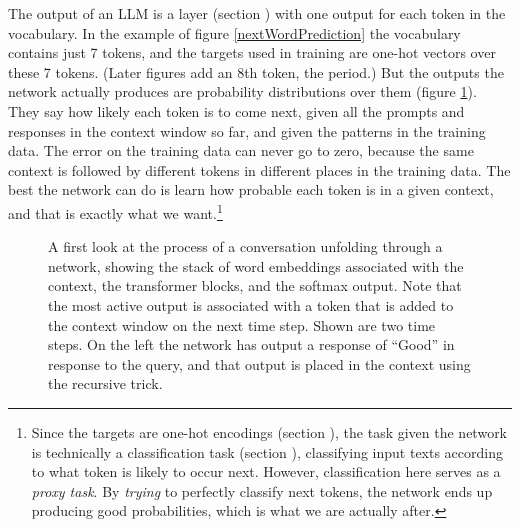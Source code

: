 The output of an LLM is a  layer (section
) with one output for each token in the vocabulary.
In the example of figure \ref{nextWordPrediction} the vocabulary contains just 7
tokens, and the targets used in training are one-hot vectors over these 7 tokens.
(Later figures add an 8th token, the period.) But the outputs the network actually produces are
probability distributions over them (figure \ref{transformerOverview}). They say
how likely each token is to come next, given all the prompts and responses in
the context window so far, and given the patterns in the training data. The
error on the training data can never go to zero, because the same context is
followed by different tokens in different places in the training data. The best
the network can do is learn how probable each token is in a given context, and
that is exactly what we want.\footnote{Since the targets are one-hot encodings
(section ), the task given the network is technically a
classification task (section ), classifying
input texts according to what token is likely to occur next. However,
classification here serves as a \emph{proxy task}. By \emph{trying} to
perfectly classify next tokens, the network ends up producing good
probabilities, which is what we are actually after.}

\begin{figure}[ht]
\centering
{} \; \; \;
\caption[Jeff Yoshimi.]{A first look at the process of a conversation unfolding
through a network, showing the stack of word embeddings associated with the
context, the transformer blocks, and the softmax output. Note that the
most active output is associated with a token that is added to the context
window on the next time step. Shown are two time steps. On the left the network
has output a response of ``Good'' in response to the query, and that output is
placed in the context using the recursive trick.
}
\label{transformerOverview}
\end{figure}

